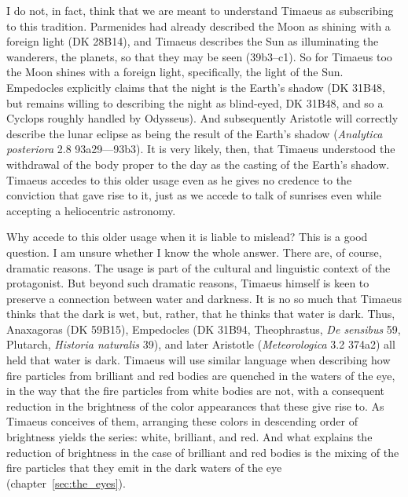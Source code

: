 I do not, in fact, think that we are meant to understand Timaeus as subscribing to this tradition. Parmenides had already described the Moon as shining with a foreign light (DK 28B14), and Timaeus describes the Sun as illuminating the wanderers, the planets, so that they may be seen (39b3--c1). So for Timaeus too the Moon shines with a foreign light, specifically, the light of the Sun. Empedocles explicitly claims that the night is the Earth's shadow (DK 31B48, but remains willing to describing the night as blind-eyed, DK 31B48, and so a Cyclops roughly handled by Odysseus). And subsequently Aristotle will correctly describe the lunar eclipse as being the result of the Earth's shadow (\emph{Analytica posteriora} 2.8 93a29—93b3). It is very likely, then, that Timaeus understood the withdrawal of the body proper to the day as the casting of the Earth's shadow. Timaeus accedes to this older usage even as he gives no credence to the conviction that gave rise to it, just as we accede to talk of sunrises even while accepting a heliocentric astronomy. 

Why accede to this older usage when it is liable to mislead? This is a good question. I am unsure whether I know the whole answer. There are, of course, dramatic reasons. The usage is part of the cultural and linguistic context of the protagonist. But beyond such dramatic reasons, Timaeus himself is keen to preserve a connection between water and darkness. It is no so much that Timaeus thinks that the dark is wet, but, rather, that he thinks that water is dark. Thus, Anaxagoras (DK 59B15), Empedocles (DK 31B94, Theophrastus, \emph{De sensibus} 59, Plutarch, \emph{Historia naturalis} 39), and later Aristotle (\emph{Meteorologica} 3.2 374a2) all held that water is dark. Timaeus will use similar language when describing how fire particles from brilliant and red bodies are quenched in the waters of the eye, in the way that the fire particles from white bodies are not, with a consequent reduction in the brightness of the color appearances that these give rise to. As Timaeus conceives of them, arranging these colors in descending order of brightness yields the series: white, brilliant, and red. And what explains the reduction of brightness in the case of brilliant and red bodies is the mixing of the fire particles that they emit in the dark waters of the eye (chapter~\ref{sec:the_eyes}). 

